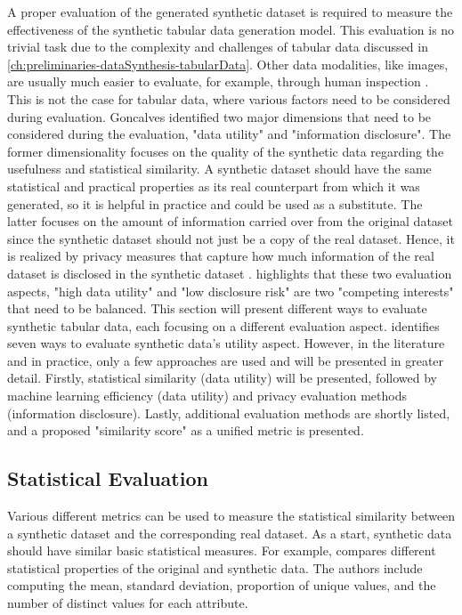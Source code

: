 A proper evaluation of the generated synthetic dataset is required to measure the effectiveness of the synthetic tabular data generation model.
This evaluation is no trivial task due to the complexity and challenges of tabular data discussed in \autoref{ch:preliminaries-dataSynthesis-tabularData}.
Other data modalities, like images, are usually much easier to evaluate, for example, through human inspection \cite{chundawat2022UniversalMetricRobust}. 
This is not the case for tabular data, where various factors need to be considered during evaluation.
Goncalves \etal identified two major dimensions that need to be considered during the evaluation, "data utility" and "information disclosure"\cite[p. 6]{goncalves2020GenerationEvaluationSynthetic}.
The former dimensionality focuses on the quality of the synthetic data regarding the usefulness and statistical similarity.
A synthetic dataset should have the same statistical and practical properties as its real counterpart from which it was generated, so it is helpful in practice and could be used as a substitute.
The latter focuses on the amount of information carried over from the original dataset since the synthetic dataset should not just be a copy of the real dataset.
Hence, it is realized by privacy measures that capture how much information of the real dataset is disclosed in the synthetic dataset \cite{goncalves2020GenerationEvaluationSynthetic}.
\cite[p. 2]{little2021GenerativeAdversarialNetworksa} highlights that these two evaluation aspects, "high data utility" and "low disclosure risk" are two "competing interests" that need to be balanced.
This section will present different ways to evaluate synthetic tabular data, each focusing on a different evaluation aspect.
\cite{elemam2020SevenWaysEvaluate} identifies seven ways to evaluate synthetic data's utility aspect.
However, in the literature and in practice, only a few approaches are used and will be presented in greater detail.
Firstly, statistical similarity (data utility) will be presented, followed by machine learning efficiency (data utility) and privacy evaluation methods (information disclosure).
Lastly, additional evaluation methods are shortly listed, and a proposed "similarity score" as a unified metric is presented.

\subsection{Statistical Evaluation}
\label{ch:preliminaries-statisticalEvaluation}

Various different metrics can be used to measure the statistical similarity between a synthetic dataset and the corresponding real dataset.
As a start, synthetic data should have similar basic statistical measures.
For example, \cite{delcarmenrodriguez-hernandez2017DataGenCARSGeneratorSynthetic} compares different statistical properties of the original and synthetic data. 
The authors include computing the mean, standard deviation, proportion of unique values, and the number of distinct values for each attribute.

